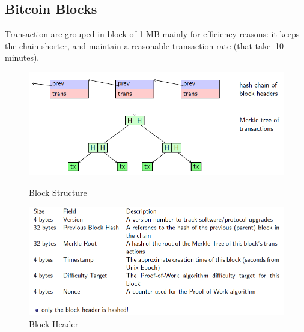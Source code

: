 \documentclass{article}
\begin{document}
\subsection{Bitcoin Blocks}
Transaction are grouped in block of 1 MB mainly for efficiency reasons: it keeps the chain shorter, and maintain a reasonable transaction rate (that take $~$10 minutes).\\
\begin{figure}
\includegraphics[scale=0.6]{26.png}
\caption{Block Structure}
\includegraphics[scale=0.6]{27.png}
\caption{Block Header}
\end{figure}
\end{document}

